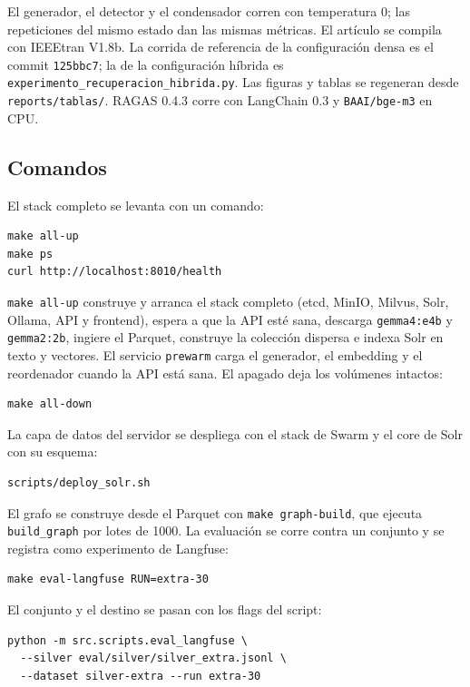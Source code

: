 El generador, el detector y el condensador corren con temperatura 0; las repeticiones del mismo estado dan las mismas m\'etricas. El art\'iculo se compila con IEEEtran V1.8b. La corrida de referencia de la configuraci\'on densa es el commit \texttt{125bbc7}; la de la configuraci\'on h\'ibrida es \texttt{experimento\_recuperacion\_hibrida.py}. Las figuras y tablas se regeneran desde \texttt{reports/tablas/}. RAGAS 0.4.3 corre con LangChain 0.3 y \texttt{BAAI/bge-m3} en CPU.

\subsection{Comandos}

El stack completo se levanta con un comando:

\begin{verbatim}
make all-up
make ps
curl http://localhost:8010/health
\end{verbatim}

\texttt{make all-up} construye y arranca el stack completo (etcd, MinIO, Milvus, Solr, Ollama, API y frontend), espera a que la API est\'e sana, descarga \texttt{gemma4:e4b} y \texttt{gemma2:2b}, ingiere el Parquet, construye la colecci\'on dispersa e indexa Solr en texto y vectores. El servicio \texttt{prewarm} carga el generador, el embedding y el reordenador cuando la API est\'a sana. El apagado deja los vol\'umenes intactos:

\begin{verbatim}
make all-down
\end{verbatim}

La capa de datos del servidor se despliega con el stack de Swarm y el core de Solr con su esquema:

\begin{verbatim}
scripts/deploy_solr.sh
\end{verbatim}

El grafo se construye desde el Parquet con \texttt{make graph-build}, que ejecuta \texttt{build\_graph} por lotes de 1000. La evaluaci\'on se corre contra un conjunto y se registra como experimento de Langfuse:

\begin{verbatim}
make eval-langfuse RUN=extra-30
\end{verbatim}

El conjunto y el destino se pasan con los flags del script:

{\footnotesize
\begin{verbatim}
python -m src.scripts.eval_langfuse \
  --silver eval/silver/silver_extra.jsonl \
  --dataset silver-extra --run extra-30
\end{verbatim}
}

